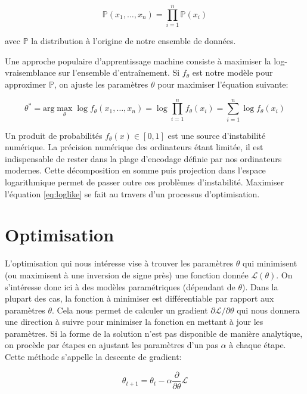 \begin{equation}
\mathbb{P}(x_{1}, \dots, x_{n}) = \prod_{i=1}^{n}\mathbb{P}(x_{i})
\end{equation}

avec $\mathbb{P}$ la distribution à l'origine de notre ensemble de données.

Une approche populaire d'apprentissage machine consiste à maximiser la
log-vraisemblance sur l'ensemble d'entraînement. 
Si $f_{\theta}$ est notre
modèle pour approximer $\mathbb{P}$, on ajuste les paramètres $\theta$ pour
maximiser l'équation suivante:

\begin{equation}
\label{eq:loglike}
\theta^{*}=\textrm{arg}\max_{\theta} \log f_{\theta}(x_{1}, \dots, x_{n}) = \log \prod_{i=1}^{n}f_{\theta}(x_{i}) = \sum_{i=1}^{n}\log f_{\theta}(x_{i})
\end{equation}

Un produit de probabilités $f_{\theta}(x)\in [0,1]$ est une source
d'instabilité numérique. La précision numérique des ordinateurs étant limitée,
il est indispensable de rester dans la plage d'encodage définie par nos
ordinateurs modernes. Cette décomposition en somme puis projection dans
l'espace logarithmique permet de passer outre ces problèmes d'instabilité.
Maximiser l'équation \ref{eq:loglike} se fait au travers d'un processus
d'optimisation. 
 
\section{Optimisation}

L'optimisation qui nous intéresse vise à trouver les paramètres $\theta$ qui
minimisent (ou maximisent à une inversion de signe près) une fonction donnée
$\mathcal{L}(\theta)$.  On s'intéresse donc ici à des modèles paramétriques
(dépendant de $\theta$). Dans la plupart des cas, la fonction à minimiser est
différentiable par rapport aux paramètres $\theta$.  Cela nous permet de
calculer un gradient $\partial \mathcal{L}/\partial\theta$ qui nous donnera une
direction à suivre pour minimiser la fonction en mettant à jour les paramètres. Si la forme de la solution n'est
pas disponible de manière analytique, on procède par étapes en ajustant les
paramètres d'un pas $\alpha$ à chaque étape. Cette méthode s'appelle la
descente de gradient:

\begin{equation}
\theta_{t+1} = \theta_{t} - \alpha \dfrac{\partial}{\partial\theta} \mathcal{L}
\end{equation}

